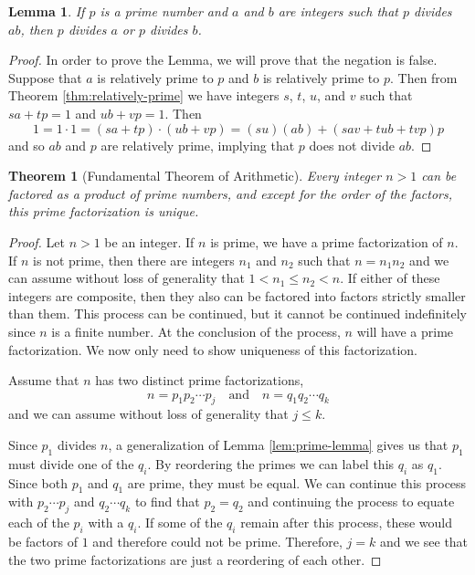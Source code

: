 \documentclass[
]{book}
\newtheorem{theorem}{Theorem}[chapter]
\newtheorem{lemma}{Lemma}[chapter]
\theoremstyle{definition}
\theoremstyle{definition}
\theoremstyle{definition}
\theoremstyle{remark}
\begin{document}
\begin{lemma}
\protect\hypertarget{lem:prime-lemma}{}{\label{lem:prime-lemma} }If \(p\) is a prime number and \(a\) and \(b\) are integers such that \(p\) divides \(ab\), then \(p\) divides \(a\) or \(p\) divides \(b\).
\end{lemma}

\begin{proof}
{}In order to prove the Lemma, we will prove that the negation is false. Suppose that \(a\) is relatively prime to \(p\) and \(b\) is relatively prime to \(p\). Then from Theorem \ref{thm:relatively-prime} we have integers \(s\), \(t\), \(u\), and \(v\) such that \(sa+tp=1\) and \(ub+vp=1\). Then
\[1= 1 \cdot 1 = (sa+tp)\cdot (ub+vp) = (su)(ab)+(sav+tub+tvp)p\] and so \(ab\) and \(p\) are relatively prime, implying that \(p\) does not divide \(ab\).
\end{proof}

\begin{theorem}[Fundamental Theorem of Arithmetic]
\protect\hypertarget{thm:unnamed-chunk-185}{}{\label{thm:unnamed-chunk-185} {} }Every integer \(n>1\) can be factored as a product of prime numbers, and except for the order of the factors, this prime factorization is unique.
\end{theorem}

\begin{proof}
{}Let \(n>1\) be an integer. If \(n\) is prime, we have a prime factorization of \(n\). If \(n\) is not prime, then there are integers \(n_1\) and \(n_2\) such that \(n=n_1 n_2\) and we can assume without loss of generality that \(1<n_1\leq n_2<n\). If either of these integers are composite, then they also can be factored into factors strictly smaller than them. This process can be continued, but it cannot be continued indefinitely since \(n\) is a finite number. At the conclusion of the process, \(n\) will have a prime factorization. We now only need to show uniqueness of this factorization.

Assume that \(n\) has two distinct prime factorizations,
\[n=p_1 p_2 \cdots p_j \quad \mbox{and} \quad n=q_1 q_2 \cdots q_k\] and we can assume without loss of generality that \(j\leq k\).

Since \(p_1\) divides \(n\), a generalization of Lemma \ref{lem:prime-lemma} gives us that \(p_1\) must divide one of the \(q_i\). By reordering the primes we can label this \(q_i\) as \(q_1\). Since both \(p_1\) and \(q_1\) are prime, they must be equal. We can continue this process with \(p_2 \cdots p_j\) and \(q_2\cdots q_k\) to find that \(p_2=q_2\) and continuing the process to equate each of the \(p_i\) with a \(q_i\). If some of the \(q_i\) remain after this process, these would be factors of \(1\) and therefore could not be prime. Therefore, \(j=k\) and we see that the two prime factorizations are just a reordering of each other.
\end{proof}
\end{document}
